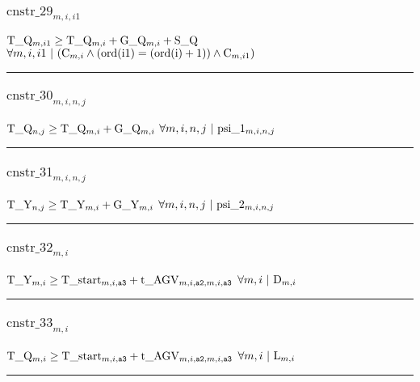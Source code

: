 \documentclass[11pt]{article}
\begin{document}
\subsubsection*{$\text{cnstr\_29}_{m, i, i1}$} \label{cnstr_29}
$
\textcolor{black}{\text{T\_Q}}_{m, i1} \geq \textcolor{black}{\text{T\_Q}}_{m, i} + \textcolor{black}{\text{G\_Q}}_{m, i} + \textcolor{black}{\text{S\_Q}}
$
\hfill
$
\forall{ m, i, i1}  ~ | ~ ( \textcolor{black}{\text{C}}_{m, i} \wedge  (  \text{ord}( \textcolor{black}{\text{i1}} )   =   (  \text{ord}( \textcolor{black}{\text{i}} )  + 1 )  )  \wedge \textcolor{black}{\text{C}}_{m, i1} )
$ \vspace{5pt}
\hrule 
\subsubsection*{$\text{cnstr\_30}_{m, i, n, j}$} \label{cnstr_30}
$
\textcolor{black}{\text{T\_Q}}_{n, j} \geq \textcolor{black}{\text{T\_Q}}_{m, i} + \textcolor{black}{\text{G\_Q}}_{m, i}
$
\hfill
$
\forall{ m, i, n, j}  ~ | ~\textcolor{black}{\text{psi\_1}}_{m, i, n, j}
$ \vspace{5pt}
\hrule 
\subsubsection*{$\text{cnstr\_31}_{m, i, n, j}$} \label{cnstr_31}
$
\textcolor{black}{\text{T\_Y}}_{n, j} \geq \textcolor{black}{\text{T\_Y}}_{m, i} + \textcolor{black}{\text{G\_Y}}_{m, i}
$
\hfill
$
\forall{ m, i, n, j}  ~ | ~\textcolor{black}{\text{psi\_2}}_{m, i, n, j}
$ \vspace{5pt}
\hrule 
\subsubsection*{$\text{cnstr\_32}_{m, i}$} \label{cnstr_32}
$
\textcolor{black}{\text{T\_Y}}_{m, i} \geq \textcolor{black}{\text{T\_start}}_{m, i, \texttt{a3}} + \textcolor{black}{\text{t\_AGV}}_{m, i, \texttt{a2}, m, i, \texttt{a3}}
$
\hfill
$
\forall{ m, i}  ~ | ~\textcolor{black}{\text{D}}_{m, i}
$ \vspace{5pt}
\hrule 
\subsubsection*{$\text{cnstr\_33}_{m, i}$} \label{cnstr_33}
$
\textcolor{black}{\text{T\_Q}}_{m, i} \geq \textcolor{black}{\text{T\_start}}_{m, i, \texttt{a3}} + \textcolor{black}{\text{t\_AGV}}_{m, i, \texttt{a2}, m, i, \texttt{a3}}
$
\hfill
$
\forall{ m, i}  ~ | ~\textcolor{black}{\text{L}}_{m, i}
$ \vspace{5pt}
\hrule 
\end{document}
